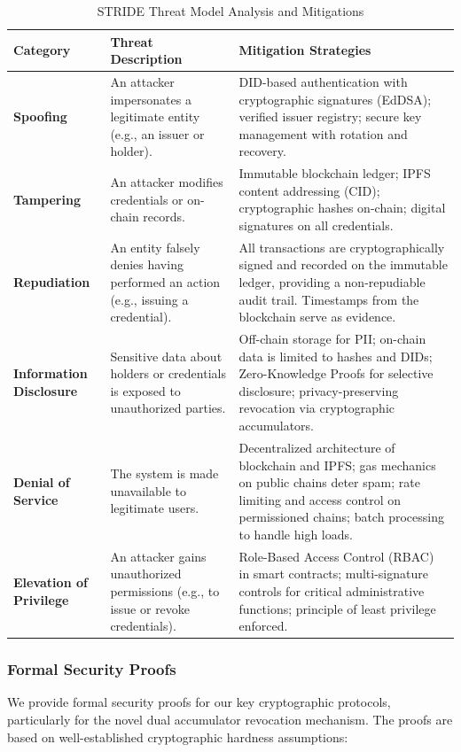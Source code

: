 \documentclass[lettersize,journal]{IEEEtran}
\begin{document}
\begin{itemize}
\begin{table}[!t]
\caption{STRIDE Threat Model Analysis and Mitigations\label{tab:stride}}
\centering
\begin{tabular}{|l|p{4.5cm}|p{8cm}|}
\hline
\textbf{Category} & \textbf{Threat Description} & \textbf{Mitigation Strategies} \\
\hline
\textbf{Spoofing} & An attacker impersonates a legitimate entity (e.g., an issuer or holder). & DID-based authentication with cryptographic signatures (EdDSA); verified issuer registry; secure key management with rotation and recovery. \\
\hline
\textbf{Tampering} & An attacker modifies credentials or on-chain records. & Immutable blockchain ledger; IPFS content addressing (CID); cryptographic hashes on-chain; digital signatures on all credentials. \\
\hline
\textbf{Repudiation} & An entity falsely denies having performed an action (e.g., issuing a credential). & All transactions are cryptographically signed and recorded on the immutable ledger, providing a non-repudiable audit trail. Timestamps from the blockchain serve as evidence. \\
\hline
\textbf{Information Disclosure} & Sensitive data about holders or credentials is exposed to unauthorized parties. & Off-chain storage for PII; on-chain data is limited to hashes and DIDs; Zero-Knowledge Proofs for selective disclosure; privacy-preserving revocation via cryptographic accumulators. \\
\hline
\textbf{Denial of Service} & The system is made unavailable to legitimate users. & Decentralized architecture of blockchain and IPFS; gas mechanics on public chains deter spam; rate limiting and access control on permissioned chains; batch processing to handle high loads. \\
\hline
\textbf{Elevation of Privilege} & An attacker gains unauthorized permissions (e.g., to issue or revoke credentials). & Role-Based Access Control (RBAC) in smart contracts; multi-signature controls for critical administrative functions; principle of least privilege enforced. \\
\hline
\end{tabular}
\end{table}

\subsubsection{Formal Security Proofs}
We provide formal security proofs for our key cryptographic protocols, particularly for the novel dual accumulator revocation mechanism. The proofs are based on well-established cryptographic hardness assumptions:


\end{itemize}
\end{document}
